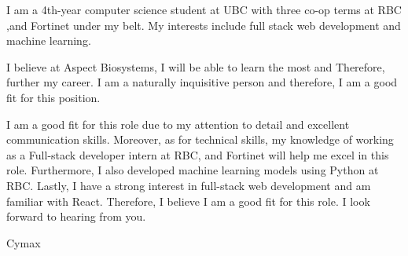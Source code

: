 \documentclass[11pt, a4paper]{awesome-cv}
\begin{document}
\makecvheader[R]


\makelettertitle

\begin{cvletter}

I am a 4th-year computer science student at UBC with three co-op terms at RBC ,and Fortinet under my belt. My interests include full stack web
development and machine learning.

I believe at Aspect Biosystems, I will be able to learn the most and Therefore, further my career. I am a naturally inquisitive person and therefore, I am a good fit for this position.

I am a good fit for this role due to my attention to detail and excellent communication skills. Moreover, as for technical skills,
my knowledge of working as a Full-stack developer intern at RBC, and Fortinet will help me excel in this role. Furthermore, I also developed 
machine learning models using Python at RBC. Lastly, I have a strong interest in full-stack web development and am familiar with React. Therefore, I believe I am a good fit for this role. 
I look forward to hearing from you.
\end{cvletter}
Cymax


\makeletterclosing
\end{document}
